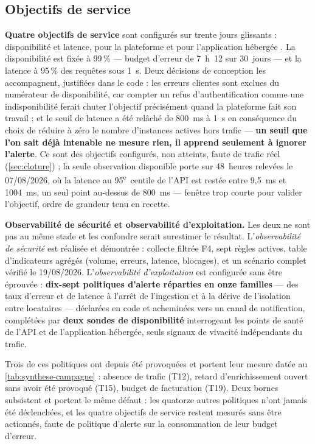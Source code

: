 \subsection{Objectifs de service}

\textbf{Quatre objectifs de service} sont configurés sur trente jours glissants : disponibilité et
latence, pour la plateforme et pour l'application hébergée \cite{gcp_architecture_framework}. La
disponibilité est fixée à 99\,\% --- budget d'erreur de 7~h~12 sur 30~jours --- et la latence à
95\,\% des requêtes sous 1~s. Deux décisions de conception les accompagnent, justifiées dans le
code : les erreurs clientes sont exclues du numérateur de disponibilité, car compter un refus
d'authentification comme une indisponibilité ferait chuter l'objectif précisément quand la
plateforme fait son travail ; et le seuil de latence a été relâché de 800~ms à 1~s en conséquence du
choix de réduire à zéro le nombre d'instances actives hors trafic --- \textbf{un seuil que l'on sait
déjà intenable ne mesure rien, il apprend seulement à ignorer l'alerte}. Ce sont des objectifs
configurés, non atteints, faute de trafic réel (\cref{sec:cloture}) ; la seule observation
disponible porte sur 48~heures relevées le 07/08/2026, où la latence au
95\textsuperscript{e}~centile de l'API est restée entre 9,5~ms et 1004~ms, un seul point au-dessus
de 800~ms --- fenêtre trop courte pour valider l'objectif, ordre de grandeur tenu en recette.

\textbf{Observabilité de sécurité et observabilité d'exploitation.} Les deux ne sont pas au même
stade et les confondre serait surestimer le résultat. L'\emph{observabilité de sécurité} est
réalisée et démontrée : collecte filtrée F4, sept règles actives, table d'indicateurs agrégés
(volume, erreurs, latence, blocages), et un scénario complet vérifié le 19/08/2026.
L'\emph{observabilité d'exploitation} est configurée sans être éprouvée : \textbf{dix-sept
politiques d'alerte réparties en onze familles} --- des taux d'erreur et de latence à l'arrêt de
l'ingestion et à la dérive de l'isolation entre locataires --- déclarées en code et acheminées vers
un canal de notification, complétées par \textbf{deux sondes de disponibilité} interrogeant les
points de santé de l'API et de l'application hébergée, seuls signaux de vivacité indépendants du
trafic.

Trois de ces politiques ont depuis été provoquées et portent leur mesure datée au
\cref{tab:synthese-campagne} : absence de trafic (T12), retard d'enrichissement ouvert sans avoir
été provoqué (T15), budget de facturation (T19). Deux bornes subsistent et portent le même défaut :
les quatorze autres politiques n'ont jamais été déclenchées, et les quatre objectifs de service
restent mesurés sans être actionnés, faute de politique d'alerte sur la consommation de leur budget
d'erreur.

